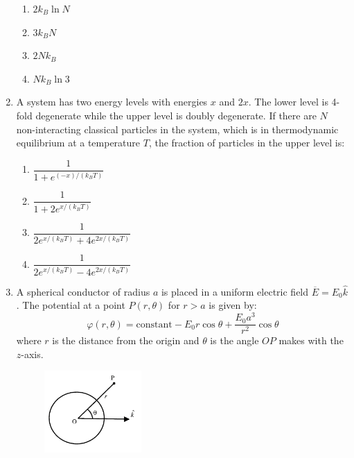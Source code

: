 \documentclass[journal,12pt,onecolumn]{IEEEtran}
\begin{document}
\begin{enumerate}
\hfill{}

\begin{multicols}{4}
\begin{enumerate}
    \item $2 k_{B} \ln N$
    \item $3 k_{B} N$
    \item $2 N k_{B}$
    \item $N k_{B} \ln 3$
\end{enumerate}
\end{multicols}

\item A system has two energy levels with energies $x$ and $2x$. The lower level is 4-fold degenerate while the upper level is doubly degenerate. If there are $N$ non-interacting classical particles in the system, which is in thermodynamic equilibrium at a temperature $T$, the fraction of particles in the upper level is:

\hfill{}

\begin{multicols}{2}
\begin{enumerate}
    \item $\dfrac{1}{1 + e^{(-x)/(k_{B}T)}}$
    \item $\dfrac{1}{1 + 2 e^{x/(k_{B}T)}}$
    \item $\dfrac{1}{2 e^{x/(k_{B}T)} + 4 e^{2x/(k_{B}T)}}$
    \item $\dfrac{1}{2 e^{x/(k_{B}T)} - 4 e^{2x/(k_{B}T)}}$
\end{enumerate}
\end{multicols}

\item A spherical conductor of radius $a$ is placed in a uniform electric field $\overline{E} = E_{0} \hat{k}$. The potential at a point $P(r,\theta)$ for $r > a$ is given by:
\[
\varphi(r,\theta) = \text{constant} - E_{0} r \cos\theta + \frac{E_{0} a^{3}}{r^{2}} \cos\theta
\]
where $r$ is the distance from the origin and $\theta$ is the angle $OP$ makes with the $z$-axis.


\begin{figure}[ht!]
    \centering
    \includegraphics[width=0.35\textwidth]{fig5.jpeg}
    \caption{}
    \label{fig:fig5.jpeg}
\end{figure}



\end{enumerate}
\end{document}
